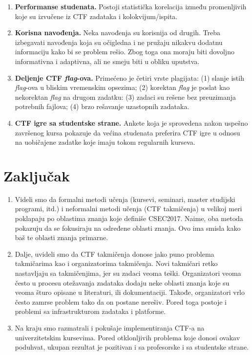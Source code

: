 \documentclass[12pt, a4paper, twocolumn]{article}
\begin{document}
\begin{enumerate}
    \item \textbf{Performanse studenata.} Postoji statistička korelacija 
        između promenljivih koje su izvučene iz CTF zadataka i 
        kolokvijum/ispita. 
    \item \textbf{Korisna navođenja.} Neka navođenja su korisnija od
        drugih. Treba izbegavati navođenja koja su očigledna i ne pružaju
        nikakvu dodatnu informaciju kako bi se problem rešio. Zbog toga ona
        moraju biti dovoljno informativna i adaptivna, ali ne smeju biti u 
        obliku uputstva.
    \item \textbf{Deljenje CTF \emph{flag}-ova.} Primećeno je četiri vrste
        plagijata: (1) slanje istih \emph{flag}-ova u bliskim vremenskim
        opsezima; (2) korektan \emph{flag} je poslat kao nekorektan
        \emph{flag} na drugom zadatku: (3) zadaci su rešene bez preuzimanja
        potrebnih fajlova; (4) brzo rešavanje uzastopnih zadataka.
    \item \textbf{CTF igre sa studentske strane.} Ankete koja je sprovedena 
        nakon uspešno završenog kursa pokazuje da većina studenata preferira
        CTF igre u odnosu na uobičajene zadatke koje imaju tokom regularnih
        kurseva.
\end{enumerate}

\section{Zaključak}

\begin{enumerate}
    \item Videli smo da formalni metodi učenja (kursevi, seminari, master 
        studijski programi, itd.) i neformalni metodi učenja (CTF takmičenja) 
        u velikoj meri poklapaju po oblastima znanja koje definiše CSEC2017. 
        Naime, oba metoda pokazuju da se fokusiraju na određene oblasti 
        znanja. Ovo ima smisla kako baš te oblasti znanja primarne.
    \item Dalje, uvideli smo da CTF takmičenja donose jako puno problema 
        takmičarima kao i organizatorima takmičenja. Novi takmičari retko 
        nastavljaju sa takmičenjima, jer su zadaci veoma teški. Organizatori 
        veoma često u procesu otežavanja zadataka dodaju neke oblasti znanja 
        koje su veoma šturo opisane u literaturi, ili dokumentaciji. Takođe, 
        organizatori vrlo često zamrse problem tako da on postane nerešiv. 
        Pored toga postoje i problemi sa infrastrukturom zadataka i platforme.
    \item Na kraju smo razmatrali i pokušaje implementiranja CTF-a na 
        univerzitetskim kursevima. Pored otklonljivih problema koje donosi 
        ovakav poduhvat, ukupan rezultat je pozitivan i sa profesorske i sa 
        studentske strane. 
\end{enumerate}
\end{document}

